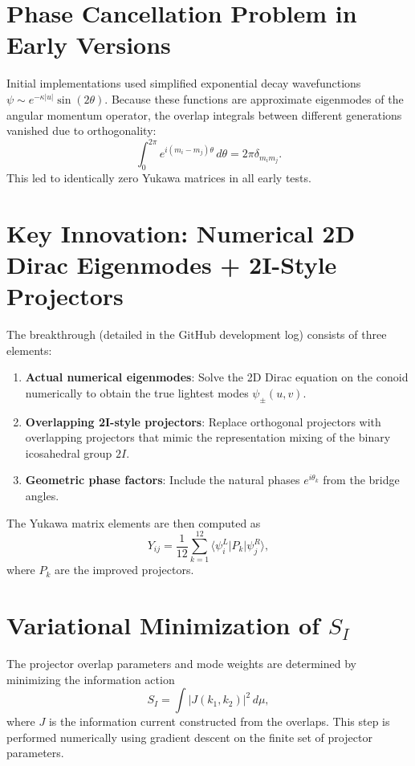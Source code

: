 \documentclass[11pt,a4paper]{article}
\begin{document}
\section{Phase Cancellation Problem in Early Versions}

Initial implementations used simplified exponential decay wavefunctions \(\psi \sim e^{-\kappa |u|} \sin(2\theta)\). Because these functions are approximate eigenmodes of the angular momentum operator, the overlap integrals between different generations vanished due to orthogonality:
\[
\int_0^{2\pi} e^{i(m_i - m_j)\theta} \, d\theta = 2\pi \delta_{m_i m_j}.
\]
This led to identically zero Yukawa matrices in all early tests.

\section{Key Innovation: Numerical 2D Dirac Eigenmodes + 2I-Style Projectors}

The breakthrough (detailed in the GitHub development log) consists of three elements:

\begin{enumerate}
\item \textbf{Actual numerical eigenmodes}: Solve the 2D Dirac equation on the conoid numerically to obtain the true lightest modes \(\psi_\pm(u,v)\).
\item \textbf{Overlapping 2I-style projectors}: Replace orthogonal projectors with overlapping projectors that mimic the representation mixing of the binary icosahedral group \(2I\).
\item \textbf{Geometric phase factors}: Include the natural phases \(e^{i\theta_k}\) from the bridge angles.
\end{enumerate}

The Yukawa matrix elements are then computed as
\[
Y_{ij} = \frac{1}{12} \sum_{k=1}^{12} \langle \psi_i^L | P_k | \psi_j^R \rangle,
\]
where \(P_k\) are the improved projectors.

\section{Variational Minimization of \(S_I\)}

The projector overlap parameters and mode weights are determined by minimizing the information action
\[
S_I = \int |J(k_1,k_2)|^2 \, d\mu,
\]
where \(J\) is the information current constructed from the overlaps. This step is performed numerically using gradient descent on the finite set of projector parameters.
\end{document}
